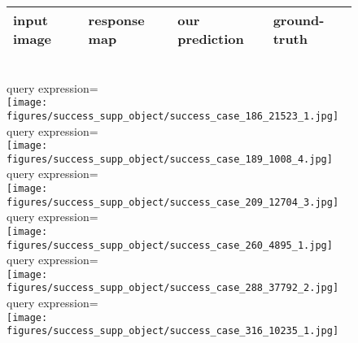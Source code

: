 \documentclass[runningheads]{llncs}
\begin{document}
\begin{figure}[t]
\centering
\begin{tabularx}{0.95\linewidth}{YYYY}
input image & response map & our prediction & ground-truth \\ \hline
\end{tabularx} \\
\small{query expression=} \\
\texttt{[image: figures/success\_supp\_object/success\_case\_186\_21523\_1.jpg]} \\
\small{query expression=} \\
\texttt{[image: figures/success\_supp\_object/success\_case\_189\_1008\_4.jpg]} \\
\small{query expression=} \\
\texttt{[image: figures/success\_supp\_object/success\_case\_209\_12704\_3.jpg]} \\
\small{query expression=} \\
\texttt{[image: figures/success\_supp\_object/success\_case\_260\_4895\_1.jpg]} \\
\small{query expression=} \\
\texttt{[image: figures/success\_supp\_object/success\_case\_288\_37792\_2.jpg]} \\
\small{query expression=} \\
\texttt{[image: figures/success\_supp\_object/success\_case\_316\_10235\_1.jpg]} \\
\end{figure}
\end{document}
